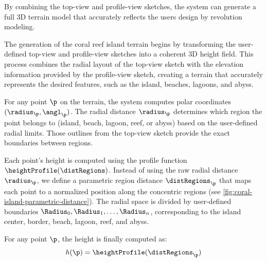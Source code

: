 By combining the top-view and profile-view sketches, the system can generate a full 3D terrain model that accurately reflects the users design by revolution modeling.

The generation of the coral reef island terrain begins by transforming the user-defined top-view and profile-view sketches into a coherent 3D height field. This process combines the radial layout of the top-view sketch with the elevation information provided by the profile-view sketch, creating a terrain that accurately represents the desired features, such as the island, beaches, lagoons, and abyss.

For any point $\p$ on the terrain, the system computes polar coordinates $(\radius_\p, \angl_\p)$. The radial distance $\radius_\p$ determines which region the point belongs to (island, beach, lagoon, reef, or abyss) based on the user-defined radial limits. Those outlines from the top-view sketch provide the exact boundaries between regions.

Each point's height is computed using the profile function $\heightProfile(\distRegions)$. Instead of using the raw radial distance $\radius_\p$, we define a parametric region distance $\distRegions_\p$ that maps each point to a normalized position along the concentric regions (see \cref{fig:coral-island-parametric-distance}). The radial space is divided by user-defined boundaries $\Radius_0, \Radius_1, \dots, \Radius_n$, corresponding to the island center, border, beach, lagoon, reef, and abyss.



For any point $\p$, the height is finally computed as:
\begin{align}
    h(\p) = \heightProfile(\distRegions_\p)
\end{align}

